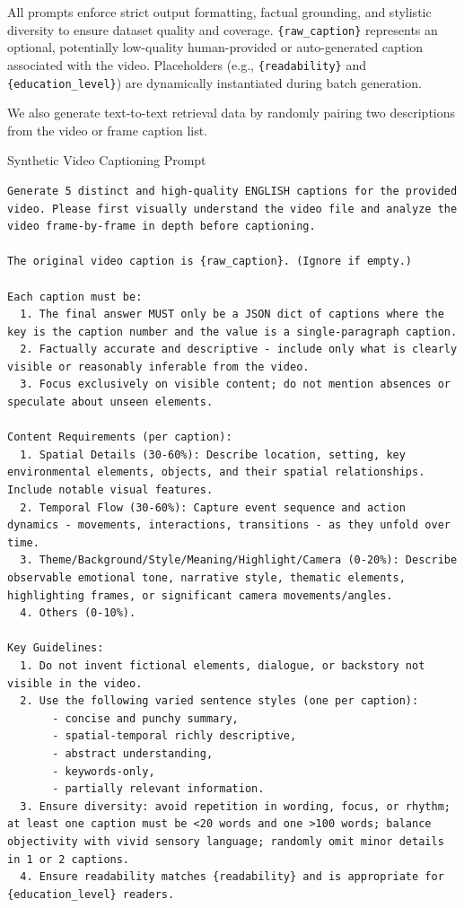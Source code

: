 All prompts enforce strict output formatting, factual grounding, and stylistic diversity to ensure dataset quality and coverage. \texttt{\{raw\_caption\}} represents an optional, potentially low-quality human-provided or auto-generated caption associated with the video. Placeholders (e.g., \texttt{\{readability\}} and \texttt{\{education\_level\}}) are dynamically instantiated during batch generation.

We also generate text-to-text retrieval data by randomly pairing two descriptions from the video or frame caption list.

\begin{promptbox}{Synthetic Video Captioning Prompt}
\begin{lstlisting}[style=promptstyle]
Generate 5 distinct and high-quality ENGLISH captions for the provided video. Please first visually understand the video file and analyze the video frame-by-frame in depth before captioning.

The original video caption is {raw_caption}. (Ignore if empty.)

Each caption must be:
  1. The final answer MUST only be a JSON dict of captions where the key is the caption number and the value is a single-paragraph caption.
  2. Factually accurate and descriptive - include only what is clearly visible or reasonably inferable from the video.
  3. Focus exclusively on visible content; do not mention absences or speculate about unseen elements.

Content Requirements (per caption):
  1. Spatial Details (30-60%): Describe location, setting, key environmental elements, objects, and their spatial relationships. Include notable visual features.
  2. Temporal Flow (30-60%): Capture event sequence and action dynamics - movements, interactions, transitions - as they unfold over time.
  3. Theme/Background/Style/Meaning/Highlight/Camera (0-20%): Describe observable emotional tone, narrative style, thematic elements, highlighting frames, or significant camera movements/angles.
  4. Others (0-10%).

Key Guidelines:
  1. Do not invent fictional elements, dialogue, or backstory not visible in the video.
  2. Use the following varied sentence styles (one per caption):
       - concise and punchy summary,
       - spatial-temporal richly descriptive,
       - abstract understanding,
       - keywords-only,
       - partially relevant information.
  3. Ensure diversity: avoid repetition in wording, focus, or rhythm; at least one caption must be <20 words and one >100 words; balance objectivity with vivid sensory language; randomly omit minor details in 1 or 2 captions.
  4. Ensure readability matches {readability} and is appropriate for {education_level} readers.


\end{lstlisting}
\end{promptbox}
